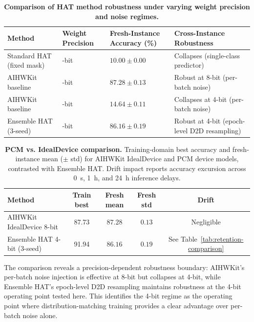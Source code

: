 \begin{table}[ht]
\centering
\caption{\textbf{Comparison of HAT method robustness under varying weight precision and noise regimes.}}
\label{tab:aihwkit-comparison}
\small
\begin{tabular}{@{}>{\raggedright\arraybackslash}p{}>{\centering\arraybackslash}p{}>{\centering\arraybackslash}p{}>{\raggedright\arraybackslash}p{}@{}}
\toprule
\textbf{Method} & \textbf{Weight Precision} & \textbf{Fresh-Instance Accuracy (\%)} & \textbf{Cross-Instance Robustness} \\
\midrule
Standard HAT (fixed mask) & 4-bit & $10.00 \pm 0.00$ & Collapses (single-class predictor) \\
AIHWKit baseline \citep{rasch2021aihwkit} & 8-bit & $87.28 \pm 0.13$ & Robust at 8-bit (per-batch noise) \\
AIHWKit baseline \citep{rasch2021aihwkit} & 4-bit & $14.64 \pm 0.11$ & Collapses at 4-bit (per-batch noise) \\
Ensemble HAT (3-seed) & 4-bit & $86.16 \pm 0.19$ & Robust at 4-bit (epoch-level D2D resampling) \\
\bottomrule
\end{tabular}
\end{table}

\begin{table}[ht]
\centering
\caption{\textbf{PCM vs. IdealDevice comparison.} Training-domain best accuracy and fresh-instance mean ($\pm$ std) for AIHWKit IdealDevice and PCM device models, contrasted with Ensemble HAT. Drift impact reports accuracy excursion across 0~s, 1~h, and 24~h inference delays.}
\label{tab:pcm-comparison}
\small
\setlength{\tabcolsep}{3pt}
\begin{tabular}{@{}p{}cccc@{}}
\toprule
\textbf{Method} & \textbf{Train best} & \textbf{Fresh mean} & \textbf{Fresh std} & \textbf{Drift} \\
\midrule
AIHWKit IdealDevice 8-bit~\citep{rasch2021aihwkit} & 87.73 & $87.28$ & $0.13$ & Negligible \\
Ensemble HAT 4-bit (3-seed) & 91.94 & $86.16$ & $0.19$ & See Table~\ref{tab:retention-comparison} \\
\bottomrule
\end{tabular}
\end{table}

The comparison reveals a precision-dependent robustness boundary: AIHWKit's per-batch noise injection is effective at 8-bit but collapses at 4-bit, while Ensemble HAT's epoch-level D2D resampling maintains robustness at the 4-bit operating point tested here. This identifies the 4-bit regime as the operating point where distribution-matching training provides a clear advantage over per-batch noise alone.

